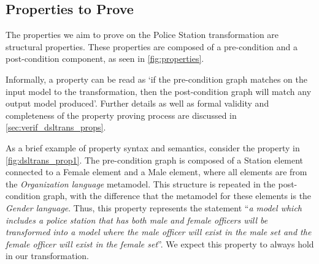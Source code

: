 \subsection{Properties to Prove}

The properties we aim to prove on the Police Station transformation are structural properties. These properties are composed of a pre-condition and a post-condition component, as seen in \cref{fig:properties}. 

Informally, a property can be read as `if the pre-condition graph matches on the input model to the transformation, then the post-condition graph will match any output model produced'. Further details as well as formal validity and completeness of the property proving process are discussed in \cref{sec:verif_dsltrans_props}.

As a brief example of property syntax and semantics, consider the property in \cref{fig:dsltrans_prop1}. The pre-condition graph is composed of a Station element connected to a Female element and a Male element, where all elements are from the \emph{Organization language} metamodel. This structure is repeated in the post-condition graph, with the difference that the metamodel for these elements is the \emph{Gender language}. Thus, this property represents the statement ``\emph{a model which includes a
police station that has both male and female officers will be
transformed into a model where the male officer will exist in the male set
and the female officer will exist in the female set}''. We expect this property to always hold in our transformation.

